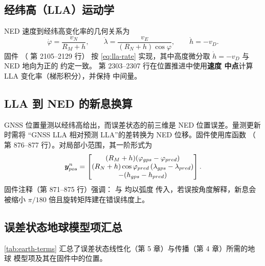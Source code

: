 \subsection{经纬高（LLA）运动学}

NED 速度到经纬高变化率的几何关系为
\begin{equation}
  \dot{\varphi} = \frac{v_N}{R_M + h},
  \qquad
  \dot{\lambda} = \frac{v_E}{(R_N + h)\cos\varphi},
  \qquad
  \dot{h} = -v_D.
  \label{eq:lla-rate}
\end{equation}
固件 （ 第 2105--2129 行）
按 \cref{eq:lla-rate} 实现，其中高度微分取 $\dot{h} = -v_D$ 与 NED 地向为正的
约定一致。 第 2303--2307 行在位置推进中使用\textbf{速度
中点}计算 LLA 变化率（梯形积分），并保持  中间量。

\subsection{LLA 到 NED 的新息换算}

GNSS 位置量测以经纬高给出，而误差状态的前三维是 NED 位置误差。量测更新时需将
``GNSS LLA 相对预测 LLA''的差转换为 NED 位移。固件使用库函数
（ 第 876--877
行）。对局部小范围，其一阶形式为
\begin{equation}
  \boldsymbol{y}_{pos}^n = \begin{bmatrix}
    (R_M + h)(\varphi_{gps} - \varphi_{pred}) \\
    (R_N + h)\cos\varphi_{pred}\,(\lambda_{gps} - \lambda_{pred}) \\
    -(h_{gps} - h_{pred})
  \end{bmatrix}.
  \label{eq:lla2ned}
\end{equation}
固件注释（第 871--875 行）强调： 与  均以弧度
传入，若误按角度解释，新息会被缩小 $\pi/180$ 倍且旋转矩阵建在错误纬度上。

\subsection{误差状态地球模型项汇总}

\cref{tab:earth-terms} 汇总了误差状态线性化（第 5 章）与传播（第 4 章）所需的地球
模型项及其在固件中的位置。

